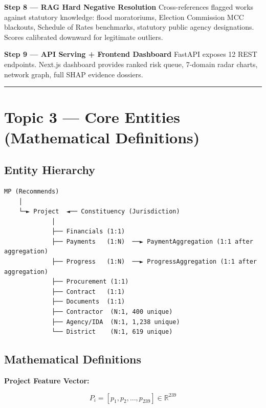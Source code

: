 \documentclass[11pt,a4paper]{article}
\begin{document}
\textbf{Step 8 --- RAG Hard Negative Resolution}
Cross-references flagged works against statutory knowledge: flood moratoriums, Election Commission MCC blackouts, Schedule of Rates benchmarks, statutory public agency designations. Scores calibrated downward for legitimate outliers.

\textbf{Step 9 --- API Serving + Frontend Dashboard}
FastAPI exposes 12 REST endpoints. Next.js dashboard provides ranked risk queue, 7-domain radar charts, network graph, full SHAP evidence dossiers.

\vspace{1em}\hrule\vspace{1em}

\section{Topic 3 --- Core Entities (Mathematical Definitions)}

\subsection{Entity Hierarchy}

\begin{tcolorbox}[colback=gray!5!white,colframe=gray!60!black,arc=1mm,boxrule=0.6pt,left=6pt,right=6pt,top=6pt,bottom=6pt]
\begin{lstlisting}[basicstyle=\ttfamily\scriptsize,breaklines=true,columns=flexible]
MP (Recommends)
    │
    └─► Project  ◄── Constituency (Jurisdiction)
             │
             ├── Financials (1:1)
             ├── Payments   (1:N)  ──► PaymentAggregation (1:1 after aggregation)
             ├── Progress   (1:N)  ──► ProgressAggregation (1:1 after aggregation)
             ├── Procurement (1:1)
             ├── Contract   (1:1)
             ├── Documents  (1:1)
             ├── Contractor  (N:1, 400 unique)
             ├── Agency/IDA  (N:1, 1,238 unique)
             └── District    (N:1, 619 unique)
\end{lstlisting}
\end{tcolorbox}


\subsection{Mathematical Definitions}

\textbf{Project Feature Vector:}

\[ P_i = [p_1, p_2, \ldots, p_{239}] \in \mathbb{R}^{239} \]
\end{document}
